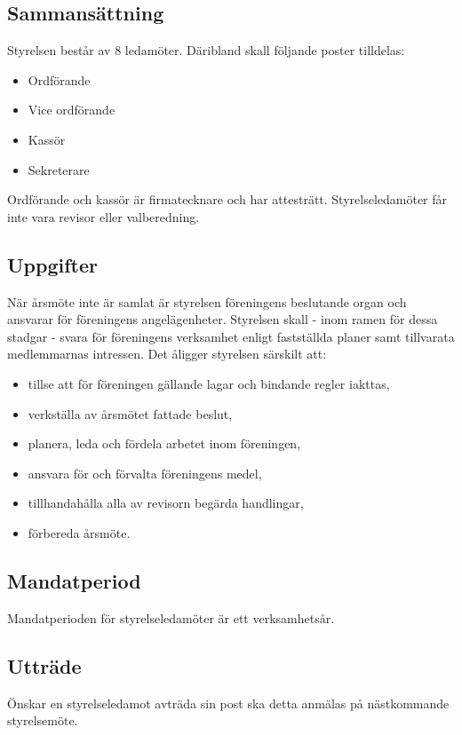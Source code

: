 \documentclass[a4paper,11pt]{article}
\begin{document}
\subsection{Sammansättning}

Styrelsen består av 8 ledamöter. Däribland skall följande poster tilldelas:

\begin{itemize}
    \item Ordförande
    \item Vice ordförande
    \item Kassör
    \item Sekreterare
\end{itemize}

Ordförande och kassör är firmatecknare och har attesträtt. Styrelseledamöter får inte vara revisor eller valberedning.

\subsection{Uppgifter}
När årsmöte inte är samlat är styrelsen föreningens beslutande organ och ansvarar för föreningens angelägenheter. Styrelsen skall - inom ramen för dessa stadgar - svara för föreningens verksamhet enligt
fastställda planer samt tillvarata medlemmarnas intressen.
Det åligger styrelsen särskilt att:
\begin{itemize}
    \item tillse att för föreningen gällande lagar och bindande regler iakttas,
    \item verkställa av årsmötet fattade beslut,
    \item planera, leda och fördela arbetet inom föreningen,
    \item ansvara för och förvalta föreningens medel,
    \item tillhandahålla alla av revisorn begärda handlingar,
    \item förbereda årsmöte.
\end{itemize}

\subsection{Mandatperiod}
Mandatperioden för styrelseledamöter är ett verksamhetsår.

\subsection{Utträde}
Önskar en styrelseledamot avträda sin post ska detta anmälas på nästkommande styrelsemöte.
\end{document}
